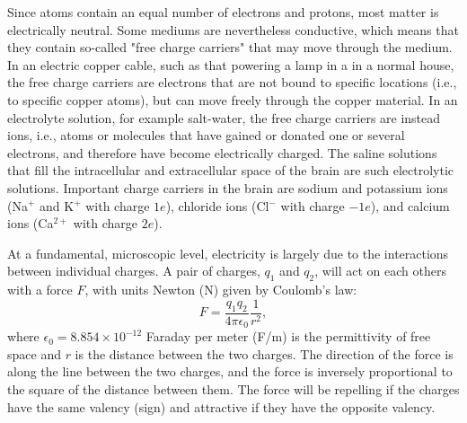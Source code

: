 Since atoms contain an equal number of electrons and protons, most matter is electrically neutral. Some mediums are nevertheless conductive, which means that they contain so-called "free charge carriers" that may move through the medium. In an electric copper cable, such as that powering a lamp in a in a normal house, the free charge carriers are electrons that are not bound to specific locations (i.e., to specific copper atoms), but can move freely through the copper material. In an electrolyte solution, for example salt-water, the free charge carriers are instead ions, i.e., atoms or molecules that have gained or donated one or several electrons, and therefore have become electrically charged. The saline solutions that fill the intracellular and extracellular space of the brain are such electrolytic solutions. Important charge carriers in the brain are sodium and potassium ions (Na$^+$ and K$^+$ with charge $1e$), chloride ions (Cl$^-$ with charge $-1e$), and calcium ions (Ca$^{2+}$ with charge $2e$).

At a fundamental, microscopic level, electricity is largely due to the interactions between individual charges. A pair of charges, $q_1$ and $q_2$, will act on each others with a force $F$, with units Newton (N) given by Coulomb's law:
\begin{equation}
F = \frac{q_1q_2}{4\pi \epsilon_0} \frac{1}{r^2}, 
\label{eq:Basics:CoulombF}
\end{equation}
where $\epsilon_0 = 8.854 \times 10^{-12}$ Faraday per meter (F/m) is the permittivity of free space and $r$ is the distance between the two charges. The direction of the force is along the line between the two charges, and the force is inversely proportional to the square of the distance between them. The force will be repelling if the charges have the same valency (sign) and attractive if they have the opposite valency. 

